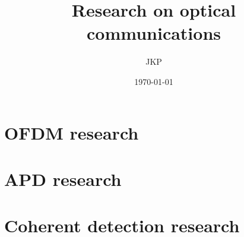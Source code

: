 \documentclass[a4paper]{article}
\title{Research on optical communications}
\author{JKP}
\date{\today}
\begin{document}
\maketitle

\section{OFDM research}


\section{APD research}


\section{Coherent detection research}




\end{document}
